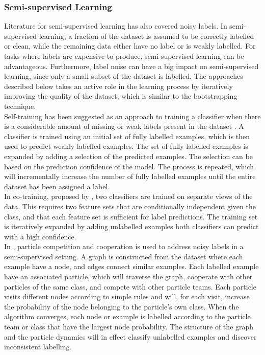 


\subsubsection{Semi-supervised Learning}
Literature for semi-supervised learning has also covered noisy labels. In semi-supervised learning, a fraction of the dataset is assumed to be correctly labelled or clean, while the remaining data either have no label or is weakly labelled. For tasks where labels are expensive to produce, semi-supervised learning can be advantageous. Furthermore, label noise can have a big impact on semi-supervised learning, since only a small subset of the dataset is labelled. The approaches described below takes an active role in the learning process by iteratively improving the quality of the dataset, which is similar to the bootstrapping technique.\\

Self-training has been suggested as an approach to training a classifier when there is a considerable amount of missing or weak labels present in the dataset \citep{Rosenberg_self-training}. A classifier is trained using an initial set of fully labelled examples, which is then used to predict weakly labelled examples. The set of fully labelled examples is expanded by adding a selection of the predicted examples. The selection can be based on the prediction confidence of the model. The process is repeated, which will incrementally increase the number of fully labelled examples until the entire dataset has been assigned a label. \\

In co-training, proposed by \cite{Blum_co-training}, two classifiers are trained on separate views of the data. This requires two feature sets that are conditionally independent given the class, and that each feature set is sufficient for label predictions. The training set is iteratively expanded by adding unlabelled examples both classifiers can predict with a high confidence. \\

In \citep{Breve_particle}, particle competition and cooperation is used to address noisy labels in a semi-supervised setting. A graph is constructed from the dataset where each example have a node, and edges connect similar examples. Each labelled example have an associated particle, which will traverse the graph, cooperate with other particles of the same class, and compete with other particle teams. Each particle visits different nodes according to simple rules and will, for each visit, increase the probability of the node belonging to the particle's own class. When the algorithm converges, each node or example is labelled according to the particle team or class that have the largest node probability. The structure of the graph and the particle dynamics will in effect classify unlabelled examples and discover inconsistent labelling. \\

